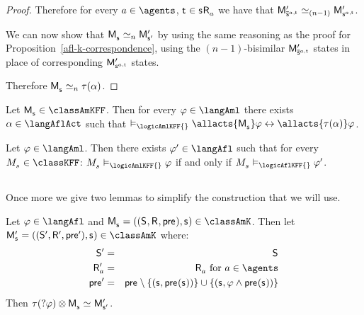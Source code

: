 \begin{proof}
Therefore for every $\agentA \in \agents$, $\aStateT \in \aStateS \aAccessibility{\agentA}$ we have that $\aPModelP{\aPStateS[\agentA,\aStateT]} \bisimilar[(n - 1)] \aPModelP{\aStateS[\agentA,\aStateT]}$.

We can now show that $\aPModel{\aStateS} \bisimilar[n] \aPModelP{\aStateSP}$ by using the same reasoning as the proof for Proposition~\ref{afl-k-correspondence}, using the $(n - 1)$-bisimilar $\aPModelP{\aPStateS[\agentA,\aStateT]}$ states in place of corresponding $\aPModelP{\aStateS[\agentA,\aStateT]}$ states.

Therefore $\aPModel{\aStateS} \bisimilar[n] \tau(\alpha)$.
\end{proof}

\begin{corollary}
Let $\aPModel{\aStateS} \in \classAmKFF$.
Then for every $\phi \in \langAml$ there exists $\alpha \in \langAflAct$ such that $\entails_\logicAmlKFF{} \allacts{\aPModel{\aStateS}} \phi \iff \allacts{\tau(\alpha)} \phi$.
\end{corollary}

\begin{corollary}
Let $\phi \in \langAml$. 
Then there exists $\phi' \in \langAfl$ such that for every $\kPModel{\kStateS} \in \classKFF$: $\kPModel{\kStateS} \entails_\logicAmlKFF{} \phi$ if and only if $\kPModel{\kStateS} \entails_\logicAflKFF{} \phi'$.
\end{corollary}

\subsection{\classS{}}

Once more we give two lemmas to simplify the construction that we will use.

\begin{lemma}\label{afl-s-construction-test}
Let $\phi \in \langAfl$ and $\aPModel{\aStateS} = \aPModelTuple{\aStateS} \in \classAmK$.
Then let $\aPModelP{\aStateS} = \aPModelTupleP{\aStateS} \in \classAmK$ where:
\begin{eqnarray*}
    \aStatesP &=& \aStates\\
    \aAccessibilityP{\agentA} &=& \aAccessibility{\agentA} \text{ for } \agentA \in \agents\\
    \aPreconditionP &=& \aPrecondition \setminus \{(\aStateS, \aPrecondition(\aStateS))\} \cup \{(\aStateS, \phi \land \aPrecondition(\aStateS))\}
\end{eqnarray*}
Then $\tau(\test{\phi}) \exec \aPModel{\aStateS} \bisimilar \aPModelP{\aStateSP}$.
\end{lemma}

